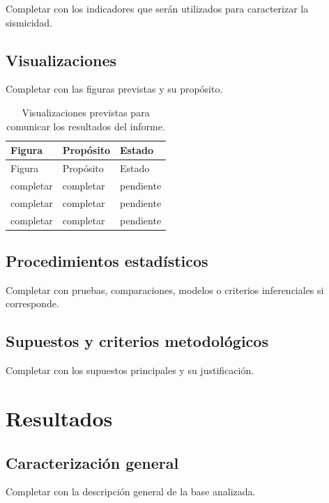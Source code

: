 \documentclass[
  spanish,
  letterpaper,
  DIV=11,
  numbers=noendperiod]{scrartcl}
\begin{document}
Completar con los indicadores que serán utilizados para caracterizar la
sismicidad.

\subsection{Visualizaciones}\label{visualizaciones}

Completar con las figuras previstas y su propósito.

\begin{longtable}[]{@{}lll@{}}
\caption{Visualizaciones previstas para comunicar los resultados del
informe.}\label{tbl-visualizaciones}\tabularnewline
\toprule\noalign{}
Figura & Propósito & Estado \\
\midrule\noalign{}
\endfirsthead
\toprule\noalign{}
Figura & Propósito & Estado \\
\midrule\noalign{}
\endhead
\bottomrule\noalign{}
\endlastfoot
completar & completar & pendiente \\
completar & completar & pendiente \\
completar & completar & pendiente \\
\end{longtable}

\subsection{Procedimientos
estadísticos}\label{procedimientos-estaduxedsticos}

Completar con pruebas, comparaciones, modelos o criterios inferenciales
si corresponde.

\subsection{Supuestos y criterios
metodológicos}\label{supuestos-y-criterios-metodoluxf3gicos}

Completar con los supuestos principales y su justificación.

\section{Resultados}\label{resultados}

\subsection{Caracterización general}\label{caracterizaciuxf3n-general}

Completar con la descripción general de la base analizada.
\end{document}
